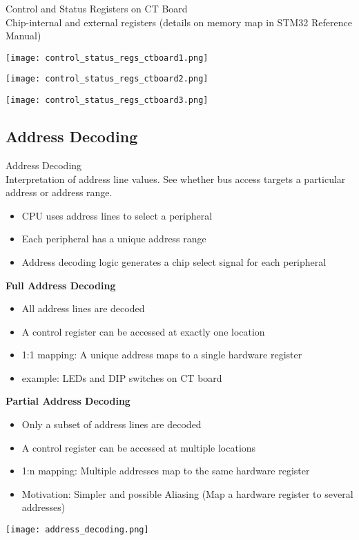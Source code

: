 \begin{theorem}{Control and Status Registers on CT Board}\\
    Chip-internal and external registers (details on memory map in STM32 Reference Manual)

    \begin{minipage}{0.4\linewidth}
    \texttt{[image: control\_status\_regs\_ctboard1.png]}
    \end{minipage}
    \begin{minipage}{0.54\linewidth}
    \texttt{[image: control\_status\_regs\_ctboard2.png]}
    \end{minipage}

    \texttt{[image: control\_status\_regs\_ctboard3.png]}
\end{theorem}


\subsection{Address Decoding}

\begin{definition}{Address Decoding}\\
    Interpretation of address line values. See whether bus access targets a particular address or address range.
    \begin{itemize}
        \item CPU uses address lines to select a peripheral
        \item Each peripheral has a unique address range
        \item Address decoding logic generates a chip select signal for each peripheral
    \end{itemize}

    \textbf{Full Address Decoding}
    \begin{itemize}
        \item All address lines are decoded
        \item A control register can be accessed at exactly one location
        \item 1:1 mapping: A unique address maps to a single hardware register
        \item example: LEDs and DIP switches on CT board
    \end{itemize}

    \textbf{Partial Address Decoding}
    \begin{itemize}
        \item Only a subset of address lines are decoded
        \item A control register can be accessed at multiple locations
        \item 1:n mapping: Multiple addresses map to the same hardware register
        \item Motivation: Simpler and possible Aliasing (Map a hardware register to several addresses)
    \end{itemize}
    \texttt{[image: address\_decoding.png]}
\end{definition}

